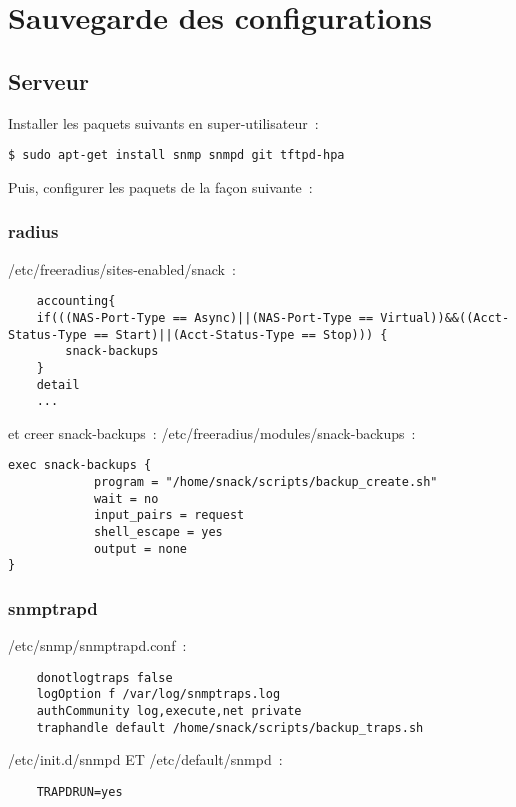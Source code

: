\section{Sauvegarde des configurations}
\subsection{Serveur}

Installer les paquets suivants en super-utilisateur~:

\begin{lstlisting}
$ sudo apt-get install snmp snmpd git tftpd-hpa
\end{lstlisting}

Puis, configurer les paquets de la façon suivante~:

\subsubsection{radius}

/etc/freeradius/sites-enabled/snack~:
\begin{lstlisting}
    accounting{
	if(((NAS-Port-Type == Async)||(NAS-Port-Type == Virtual))&&((Acct-Status-Type == Start)||(Acct-Status-Type == Stop))) {
	    snack-backups
	}
	detail
	...
\end{lstlisting}

et creer snack-backups~:
/etc/freeradius/modules/snack-backups~:
\begin{lstlisting}
exec snack-backups {
            program = "/home/snack/scripts/backup_create.sh"
            wait = no
            input_pairs = request
            shell_escape = yes
            output = none
}
\end{lstlisting}


\subsubsection{snmptrapd}

/etc/snmp/snmptrapd.conf~:
\begin{lstlisting}
	donotlogtraps false
	logOption f /var/log/snmptraps.log
	authCommunity log,execute,net private
	traphandle default /home/snack/scripts/backup_traps.sh
\end{lstlisting}

/etc/init.d/snmpd ET /etc/default/snmpd~:

\begin{lstlisting}
    TRAPDRUN=yes
\end{lstlisting}


